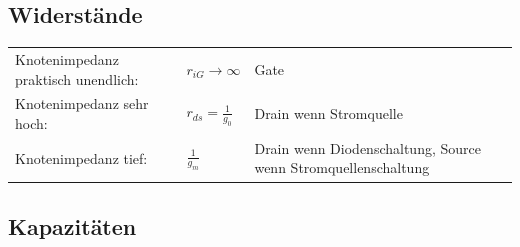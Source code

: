 \subsection{Widerstände}
\begin{tabular}{lll}
	Knotenimpedanz praktisch unendlich: &$r_{iG}\rightarrow \infty$ & Gate \\
	Knotenimpedanz sehr hoch: &$r_{ds} = \frac{1}{g_0}$ & Drain wenn Stromquelle\\
	Knotenimpedanz tief: &$\frac{1}{g_m}$ & Drain wenn Diodenschaltung, Source wenn Stromquellenschaltung \\
\end{tabular}
\subsection{Kapazitäten}
